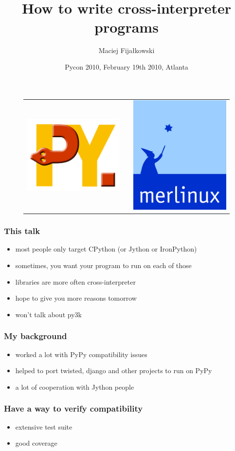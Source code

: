 \documentclass[utf8x, 14pt]{beamer}
\title{How to write cross-interpreter programs}
\author{Maciej Fijałkowski}
\institute[merlinux GmbH]
{ merlinux GmbH }
\date{Pycon 2010, February 19th 2010, Atlanta}
\begin{document}
\begin{frame}
  \titlepage
  \begin{figure}
    \begin{tabular}{c c c}
    \includegraphics[width=.20\textwidth]{../common/pypy-logo.png}
    &
    \hspace{2cm}
    &
    \includegraphics[width=.18\textwidth]{../common/merlinux-logo.png}
    \end{tabular}
  \end{figure}
\end{frame}

\begin{frame}
  \frametitle{This talk}
  \begin{itemize}
    \item most people only target CPython (or Jython or IronPython)
    \item sometimes, you want your program to run on each of those
    \item libraries are more often cross-interpreter
      \pause
    \item hope to give you more reasons tomorrow
      \pause
    \item won't talk about py3k
  \end{itemize}
\end{frame}

\begin{frame}
  \frametitle{My background}
  \begin{itemize}
    \item worked a lot with PyPy compatibility issues
    \item helped to port twisted, django and other projects to run on PyPy
    \item a lot of cooperation with Jython people
  \end{itemize}
\end{frame}

\begin{frame}
  \frametitle{Have a way to verify compatibility}
  \begin{itemize}
    \item extensive test suite
    \item good coverage
  \end{itemize}
\end{frame}
\end{document}

